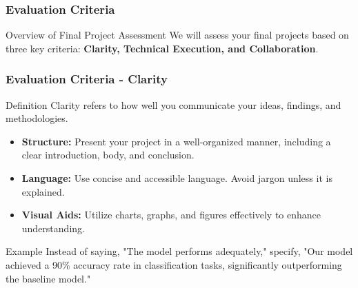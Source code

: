 \documentclass[aspectratio=169]{beamer}
\begin{document}
\begin{frame}
    \frametitle{Evaluation Criteria}
    \begin{block}{Overview of Final Project Assessment}
        We will assess your final projects based on three key criteria: \textbf{Clarity, Technical Execution, and Collaboration}.
    \end{block}
\end{frame}

\begin{frame}
    \frametitle{Evaluation Criteria - Clarity}
    \begin{block}{Definition}
        Clarity refers to how well you communicate your ideas, findings, and methodologies.
    \end{block}
    \begin{itemize}
        \item \textbf{Structure:} Present your project in a well-organized manner, including a clear introduction, body, and conclusion.
        \item \textbf{Language:} Use concise and accessible language. Avoid jargon unless it is explained.
        \item \textbf{Visual Aids:} Utilize charts, graphs, and figures effectively to enhance understanding.
    \end{itemize}
    \begin{block}{Example}
        Instead of saying, "The model performs adequately," specify, "Our model achieved a 90\% accuracy rate in classification tasks, significantly outperforming the baseline model."
    \end{block}
\end{frame}
\end{document}
